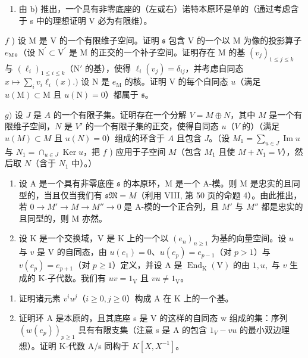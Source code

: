 \begin{enumerate}
\def\labelenumi{\alph{enumi})}
\setcounter{enumi}{4}
\tightlist
\item
  由 b) 推出，一个具有非零底座的（左或右）诺特本原环是单的（通过考虑含于 s 中的理想证明 V 必为有限维）。
\end{enumerate}

\(f\) ) 设 M 是 V 的一个有限维子空间。证明 \(\mathfrak{s}\) 包含 V 的一个以 M 为像的投影算子 \(e_{\mathrm{M}}\)。（设 \(\mathrm{N}^{\prime}\subset \mathrm{V}^{\prime}\) 是 M 的正交的一个补子空间。证明存在 M 的基 \((v_{j})_{1\leqslant j\leqslant k}\) 与 \((\ell_i)_{1\leqslant i\leqslant k}\)（\(\mathrm{N}'\) 的基），使得 \(\ell_i(v_j) = \delta_{ij}\)，并考虑自同态 \(x\mapsto \sum_{i}v_{i}\ell_{i}(x).)\) 设 N 是 \(e_{\mathrm{M}}\) 的核。证明 V 的每个自同态 \(u\)（满足 \(u(\mathrm{M})\subset \mathrm{M}\) 且 \(u(\mathrm{N}) = 0\)）都属于 \(\mathfrak{s}\)。

\(g)\) 设 \(J\) 是 \(A\) 的一个有限子集。证明存在一个分解 \(V = M \oplus N\)，其中 \(M\) 是一个有限维子空间，\(N\) 是 \(V'\) 的一个有限子集的正交，使得自同态 \(u\)（\(V\) 的）（满足 \(u(M) \subset M\) 且 \(u(N) = 0\)）组成的环含于 \(A\) 且包含 \(J\)。（设 \(M_1 = \sum_{u \in J} \operatorname{Im} u\) 与 \(N_1 = \cap_{u \in J} \operatorname{Ker} u\)，把 \(f\) ) 应用于子空间 \(M\)（包含 \(M_1\) 且使 \(M + N_1 = V\)），然后取 \(N\)（含于 \(N_1\) 中）。）

\begin{enumerate}
\def\labelenumi{\arabic{enumi})}
\setcounter{enumi}{9}
\item
  设 A 是一个具有非零底座 \(\mathfrak{s}\) 的本原环，M 是一个 A-模。则 M 是忠实的且同型的，当且仅当我们有 \(\mathfrak{sM} = M\)（利用 VIII, 第 50 页的命题 4）。由此推出，若 \(0 \to M' \to M \to M'' \to 0\) 是 A-模的一个正合列，且 \(M'\) 与 \(M''\) 都是忠实的且同型的，则 M 亦然。
\item
  设 \(\mathrm{K}\) 是一个交换域，\(\mathrm{V}\) 是 \(\mathrm{K}\) 上的一个以 \((e_n)_{n\geqslant 1}\) 为基的向量空间。设 \(u\) 与 \(v\) 是 \(\mathrm{V}\) 的自同态，由 \(u(e_1) = 0\)、\(u(e_p) = e_{p - 1}\)（对 \(p > 1\)）与 \(v(e_p) = e_{p + 1}\)（对 \(p\geqslant 1\)）定义，并设 \(\mathrm{A}\) 是 \(\operatorname {End}_{\mathrm{K}}(\mathrm{V})\) 的由 \(1, u,\) 与 \(v\) 生成的 K-子代数。我们有 \(uv = 1_{\mathrm{V}}\) 且 \(vu\neq 1_{\mathrm{V}}\)。
\end{enumerate}

\begin{enumerate}
\def\labelenumi{\alph{enumi})}
\item
  证明诸元素 \(v^i u^j\)（\(i \geqslant 0, j \geqslant 0\)）构成 A 在 K 上的一个基。
\item
  证明环 A 是本原的，且其底座 s 是 V 的这样的自同态 w 组成的集：序列 \((w(e_{p}))_{p\geqslant1}\) 具有有限支集（注意 s 是 A 的包含 \(1_{V}-vu\) 的最小双边理想）。证明 K-代数 A/s 同构于 \(K[X,X^{-1}]\)。
\end{enumerate}

